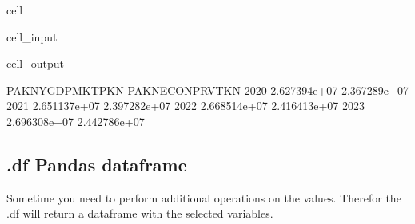 \documentclass[letterpaper,10pt,english]{jupyterBook}
\begin{document}
\begin{sphinxuseclass}{cell}\begin{sphinxVerbatimInput}

\begin{sphinxuseclass}{cell_input}
\begin{sphinxVerbatim}[commandchars=\\\{\}]
\PYG{p}{[}\PYG{p}{]} 
\end{sphinxVerbatim}

\end{sphinxuseclass}\end{sphinxVerbatimInput}
\begin{sphinxVerbatimOutput}

\begin{sphinxuseclass}{cell_output}
\begin{sphinxVerbatim}[commandchars=\\\{\}]
      PAKNYGDPMKTPKN  PAKNECONPRVTKN
2020    2.627394e+07    2.367289e+07
2021    2.651137e+07    2.397282e+07
2022    2.668514e+07    2.416413e+07
2023    2.696308e+07    2.442786e+07
\end{sphinxVerbatim}

\end{sphinxuseclass}\end{sphinxVerbatimOutput}

\end{sphinxuseclass}

\subsection{.df  Pandas dataframe}
\label{\detokenize{content/notebooks/modelflow_features:df-pandas-dataframe}}
\sphinxAtStartPar
Sometime you need to perform additional operations on the values. Therefor the .df will return a dataframe with the selected variables.
\end{document}
